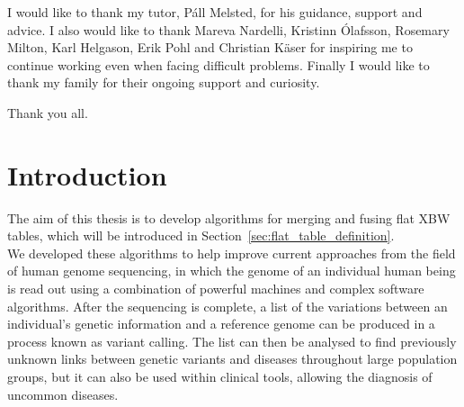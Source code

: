 \documentclass[a4paper,12pt,twoside,BCOR=10mm]{scrbook}
\begin{document}
%
%
%
%
%

I would like to thank my tutor, Páll Melsted, for his guidance, support and advice.
I also would like to thank Mareva Nardelli, Kristinn Ólafsson, Rosemary Milton,
Karl Helgason, Erik Pohl and Christian Käser
for inspiring me to continue working even when facing difficult problems.
Finally I would like to thank my family for their ongoing support and curiosity.

Thank you all.

\chapter{Introduction}
\setcounter{page}{1}


The aim of this thesis is to develop algorithms for merging and fusing flat XBW tables,
which will be introduced in Section~\ref{sec:flat_table_definition}. \\
We developed these algorithms to help improve current approaches from the field of human genome sequencing,
in which the genome of an individual human being is read out using a combination of
powerful machines and complex software algorithms.
After the sequencing is complete, a list of the variations between an individual's genetic information
and a reference genome can be produced in a process known as variant calling.
The list can then be analysed to find previously unknown links between genetic variants and
diseases throughout large population groups, but it can also be used within clinical tools, allowing the
diagnosis of uncommon diseases.
\end{document}
